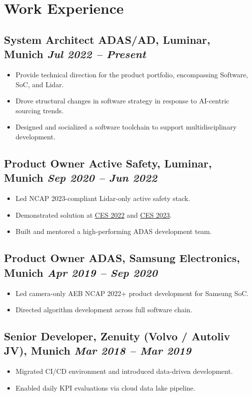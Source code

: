 \documentclass[10pt,a4paper]{article}
\begin{document}
\vspace{1.2em}

\section*{Work Experience}

\subsection*{System Architect ADAS/AD, Luminar, Munich \hfill \textit{Jul 2022 – Present}}
\begin{itemize}
    \item Provide technical direction for the product portfolio, encompassing Software, SoC, and Lidar.
    \item Drove structural changes in software strategy in response to AI-centric sourcing trends.
    \item Designed and socialized a software toolchain to support multidisciplinary development.
\end{itemize}

\subsection*{Product Owner Active Safety, Luminar, Munich \hfill \textit{Sep 2020 – Jun 2022}}
\begin{itemize}
    \item Led NCAP 2023-compliant Lidar-only active safety stack.
    \item Demonstrated solution at \href{https://ces.tech}{CES 2022} and \href{https://ces.tech}{CES 2023}.
    \item Built and mentored a high-performing ADAS development team.
\end{itemize}

\subsection*{Product Owner ADAS, Samsung Electronics, Munich \hfill \textit{Apr 2019 – Sep 2020}}
\begin{itemize}
    \item Led camera-only AEB NCAP 2022+ product development for Samsung SoC.
    \item Directed algorithm development across full software chain.
\end{itemize}

\subsection*{Senior Developer, Zenuity (Volvo / Autoliv JV), Munich \hfill \textit{Mar 2018 – Mar 2019}}
\begin{itemize}
    \item Migrated CI/CD environment and introduced data-driven development.
    \item Enabled daily KPI evaluations via cloud data lake pipeline.
\end{itemize}
\end{document}
